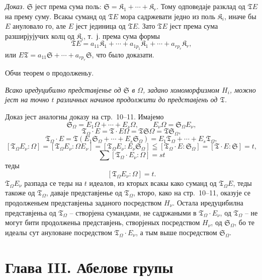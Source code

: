\documentclass[11pt]{article}
\begin{document}
\emph{Доказ.} \(\mathfrak S\) јест према сума поль: \(\mathfrak S=\mathfrak K_1+\cdots+\mathfrak K_r\). Тому одповедаје разклад од \(\mathfrak T E\) на прему суму. Всакы суманд од \(\mathfrak T E\) мора садржевати једно из поль \(\mathfrak K_i\), иначе бы \(E\) ануловало го, але \(E\) јест јединица од \(\mathfrak T E\). Зато \(\mathfrak T E\) јест према сума разширјујучих колц од \(\mathfrak K_i\), т.~ј. према сума формы
\[
\mathfrak T E=a_{11}\mathfrak K_1+\cdots+a_{1p_1}\mathfrak K_1+\cdots+a_{rp_r}\mathfrak K_r,
\]
или \(E\mathfrak T=a_{11}\mathfrak S+\cdots+a_{rp_r}\mathfrak S\), что было доказати.

\begin{center}
Обчи теорем о продолженьу.
\end{center}

\emph{Всако иредуцибилно представјенье од \(\mathfrak S\) в \(\Omega\), задано хомоморфизмом \(H_i\), можно јест на точно \(t\) различных начинов продолжити до представјень од \(\mathfrak T\).}

Доказ јест аналогны доказу на стр.~10--11. Имајемо
\[
\mathfrak S_\Omega=E_1\Omega+\cdots+E_s\Omega,\qquad
E_\nu\Omega=\mathfrak S_\Omega E_\nu,
\]
\[
\mathfrak T_\Omega\cdot E=\mathfrak T\cdot E\Omega
=\mathfrak T\mathfrak S\Omega=\mathfrak T\mathfrak S_\Omega,
\]
\[
\mathfrak T_\Omega\cdot E
=\mathfrak T(E_1\mathfrak S_\Omega+\cdots+E_s\mathfrak S_\Omega)
=E_1\mathfrak T_\Omega+\cdots+E_s\mathfrak T_\Omega,
\]
\[
[\mathfrak T_\Omega E_\nu:\Omega]
=[\mathfrak T_\Omega E_\nu:\Omega E_\nu]
=[\mathfrak T_\Omega E_\nu:E_\nu\mathfrak S_\Omega]
\leqq[\mathfrak T_\Omega\cdot E:\mathfrak S_\Omega]
=[\mathfrak T\cdot E:\mathfrak S]=t,
\]
\[
\sum[\mathfrak T_\Omega\cdot E_\nu:\Omega]=st
\]
теды
\[
[\mathfrak T_\Omega E_\nu:\Omega]=t.
\]
\(\mathfrak T_\Omega E_\nu\) разпада се теды на \(t\) идеалов, из кторых всакы како суманд од \(\mathfrak T_\Omega E\), теды такоже од \(\mathfrak T_\Omega\), даваје представјенье од \(\mathfrak T_\Omega\), кторо, како на стр.~10--11, оказује се продолженьем представјеньа заданого посредством \(H_\nu\). Остала иредуцибилна представјеньа од \(\mathfrak T_\Omega\) -- створјена сумандами, не садржаными в \(\mathfrak T_\Omega\cdot E_\nu\), од \(\mathfrak T_\Omega\) -- не могут бити продолженьа представјень, створјеных посредством \(H_\nu\), од \(\mathfrak S_\Omega\), бо те идеалы сут ануловане посредством \(\mathfrak T_\Omega\cdot E_\nu\), а тым выше посредством \(\mathfrak S_\Omega\).

\section*{Глава III. Абелове групы}\label{kapitel-iii.-abelsche-gruppen}
\end{document}
